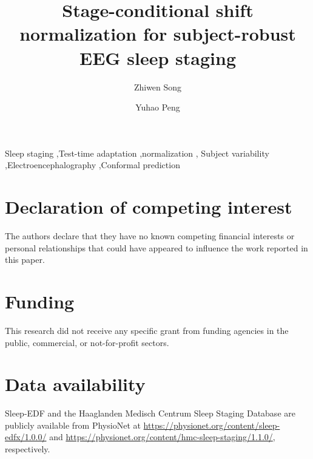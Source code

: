 \documentclass[preprint,12pt]{elsarticle}
\theoremstyle{definition}
\theoremstyle{remark}
\begin{document}
\begin{frontmatter}

\title{Stage-conditional shift normalization for subject-robust EEG sleep
staging}

\author[aff1]{Zhiwen Song}
\author[aff1]{Yuhao Peng}

\begin{abstract}

\end{abstract}

\begin{keyword}
Sleep staging \sep Test-time adaptation \sep normalization \sep
Subject variability \sep Electroencephalography \sep Conformal prediction
\end{keyword}

\end{frontmatter}

\ifdefined\REVIEWCOPY
\doublespacing
\linenumbers
\fi









\section*{Declaration of competing interest}
The authors declare that they have no known competing financial interests or
personal relationships that could have appeared to influence the work
reported in this paper.

\section*{Funding}
This research did not receive any specific grant from funding agencies in the
public, commercial, or not-for-profit sectors.

\section*{Data availability}
Sleep-EDF and the Haaglanden Medisch Centrum Sleep Staging Database are
publicly available from PhysioNet at
\url{https://physionet.org/content/sleep-edfx/1.0.0/} and
\url{https://physionet.org/content/hmc-sleep-staging/1.1.0/}, respectively.
\end{document}
